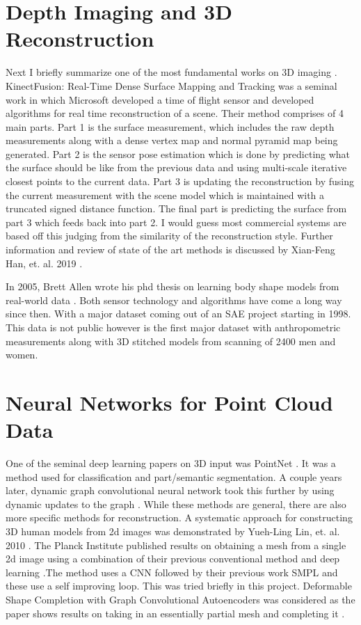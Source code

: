 \section{Depth Imaging and 3D Reconstruction}

Next I briefly summarize one of the most fundamental works on 3D imaging \cite{izadi2011kinectfusion}. KinectFusion: Real-Time Dense Surface Mapping and Tracking was a seminal work in which Microsoft developed a time of flight sensor and developed algorithms for real time reconstruction of a scene. Their method comprises of 4 main parts. Part 1 is the surface measurement, which includes the raw depth measurements along with a dense vertex map and normal pyramid map being generated. Part 2 is the sensor pose estimation which is done by predicting what the surface should be like from the previous data and using multi-scale iterative closest points to the current data. Part 3 is updating the reconstruction by fusing the current measurement with the scene model which is maintained with a truncated signed distance function. The final part is predicting the surface from part 3 which feeds back into part 2. I would guess most commercial systems are based off this judging from the similarity of the reconstruction style.
Further information and review of state of the art methods is discussed by Xian-Feng Han, et. al. 2019 \cite{DBLP:journals/corr/abs-1906-06543}.

In 2005, Brett Allen wrote his phd thesis on learning body shape models from real-world data \cite{allen2005learning}. Both sensor technology and algorithms have come a long way since then. With a major dataset coming out of an SAE project starting in 1998. This data is not public however is the first major dataset with anthropometric measurements along with 3D stitched models from scanning of 2400 men and women.

\section{Neural Networks for Point Cloud Data}
One of the seminal deep learning papers on 3D input was PointNet \cite{DBLP:journals/corr/QiSMG16}. It was a method used for classification and part/semantic segmentation. A couple years later, dynamic graph convolutional neural network took this further by using dynamic updates to the graph \cite{DBLP:journals/corr/abs-1801-07829}. While these methods are general, there are also more specific methods for reconstruction. A systematic approach for constructing 3D human models from 2d images was demonstrated by Yueh-Ling Lin, et. al. 2010 \cite{5645897}. The Planck Institute published results on obtaining a mesh from a single 2d image using a combination of their previous conventional method and deep learning \cite{kolotouros2019learning}.The method uses a CNN followed by their previous work SMPL and these use a self improving loop. This was tried briefly in this project. Deformable Shape Completion with Graph Convolutional Autoencoders was considered as the paper shows results on taking in an essentially partial mesh and completing it \cite{litany2018deformable}. 

